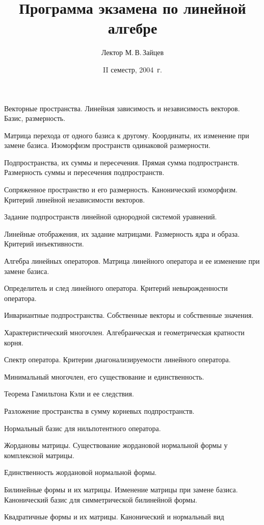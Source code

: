 \documentclass[a4paper]{article}
\title{Программа экзамена по линейной алгебре}
\author{Лектор М.\,В.\,Зайцев}
\date{II семестр, 2004~г.}
\begin{document}
\maketitle

\begin{nums}{-2}
\item Векторные пространства. Линейная зависимость и независимость векторов.
Базис, размерность.
\item Матрица перехода от одного базиса к другому. Координаты, их изменение при
замене базиса. Изоморфизм пространств одинаковой размерности.
\item Подпространства, их суммы и пересечения. Прямая сумма подпространств.
Размерность суммы и пересечения подпространств.
\item Сопряженное пространство и его размерность. Канонический изоморфизм.
Критерий линейной независимости векторов.
\item Задание подпространств линейной однородной системой уравнений.
\item Линейные отображения, их задание матрицами. Размерность ядра и образа.
Критерий инъективности.
\item Алгебра линейных операторов. Матрица линейного оператора и ее изменение
при замене базиса.
\item Определитель и след линейного оператора. Критерий невырожденности
оператора.
\item Инвариантные подпространства. Собственные векторы и собственные значения.
\item Характеристический многочлен. Алгебраическая и геометрическая кратности
корня.
\item Спектр оператора. Критерии диагонализируемости линейного оператора.
\item Минимальный многочлен, его существование и единственность.
\item Теорема Гамильтона Кэли и ее следствия.
\item Разложение пространства в сумму корневых подпространств.
\item Нормальный базис для нильпотентного оператора.
\item Жордановы матрицы. Существование жордановой нормальной формы у
комплексной матрицы.
\item Единственность жордановой нормальной формы.
\item Билинейные формы и их матрицы. Изменение матрицы при замене базиса.
Канонический базис для симметрической билинейной формы.
\item Квадратичные формы и их матрицы. Канонический и нормальный вид

\end{nums}
\end{document}
